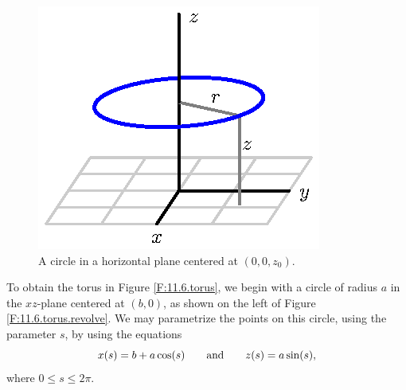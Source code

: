 \begin{example}
\begin{figure}[ht]
  \begin{center}
    \includegraphics{figures/fig_11_6_revolve.eps}
  \end{center}
  \caption{A circle in a horizontal plane centered at $(0,0,z_0)$.}
  \label{F:11.6.revolve}
\end{figure}

To obtain the torus in Figure \ref{F:11.6.torus}, we begin with a circle of radius $a$ in the
$xz$-plane centered at $(b,0)$, as shown 
on the left of Figure \ref{F:11.6.torus.revolve}.  We may parametrize
the points on this circle, using the parameter $s$, by using the equations
$$
x(s) = b + a\cos(s)\hspace*{20pt}\mbox{and}\hspace*{20pt}
z(s) = a\sin(s),
$$
where $0\leq s \leq 2\pi$.  


\end{example}
